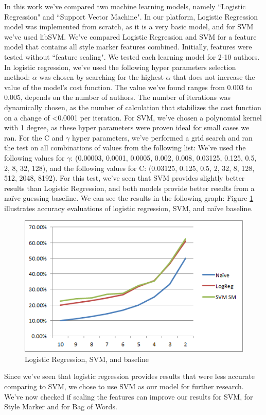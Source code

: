 \documentclass[a4paper]{article}
\begin{document}
In this work we've compared two machine learning models, namely ``Logistic Regression" and ``Support Vector Machine".
In our platform, Logistic Regression model was implemented from scratch, as it is a very basic model, and for SVM we've used libSVM\citep{chang}.
We've compared Logistic Regression and SVM for a feature model that contains all style marker features combined.
Initially, features were tested without ``feature scaling".
We tested each learning model for 2-10 authors.
In logistic regression, we've used the following hyper parameters selection method:
$\alpha$ was chosen by searching for the highest $\alpha$ that does not increase the value of the model's cost function. The value we've found ranges from 0.003 to 0.005, depends on the number of authors.
The number of iterations was dynamically chosen, as the number of calculation that stabilizes the cost function on a change of \textless 0.0001 per iteration.
For SVM, we've chosen a polynomial kernel with 1 degree, as these hyper parameters were proven ideal for small cases we ran. For the C and $\gamma$ hyper parameters, we've performed a grid search and ran the test on all combinations of values from the following list:
We've used the following values for $\gamma$: (0.00003, 0.0001, 0.0005, 0.002, 0.008, 0.03125, 0.125, 0.5, 2, 8, 32, 128), and the following values for C: (0.03125, 0.125, 0.5, 2, 32, 8, 128, 512, 2048, 8192).
For this test, we've seen that SVM provides slightly better results than Logistic Regression, and both models provide better results from a na\"ive guessing baseline. We can see the results in the following graph:
Figure \ref{fig:LR vs. SVM} illustrates accuracy evaluations of logistic regression, SVM, and na\"ive baseline.
\begin{figure}[!h]
	\centering
	\includegraphics[width=.5\textwidth]{"figures/lrvssvm"}
	\caption{Logistic Regression, SVM, and baseline}
		\label{fig:LR vs. SVM}
\end{figure}
Since we've seen that logistic regression provides results that were less accurate comparing to SVM, we chose to use SVM as our model for further research.
We've now checked if scaling the features can improve our results for SVM, for Style Marker and for Bag of Words.
\end{document}
